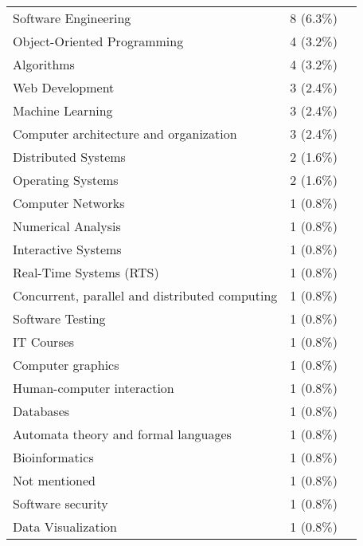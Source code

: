 \begin{table}[ht]
\begin{tabular}{l c p{4cm}}
		Software Engineering & 8 (6.3\%) & \cite{farah2023prompting,hanifi2023chatgpt,kirova2024software,kruger2024performance,petrovska2024incorporating,rasnayaka2024empirical,rodriguezecheverria2024analysis,tanay2024exploratory} \\
		Object-Oriented Programming & 4 (3.2\%) & \cite{cipriano2023gpt3,cipriano2024llms,kruger2024performance,pankiewicz2023large} \\
		Algorithms & 4 (3.2\%) & \cite{jin2024teach,kuramitsu2023kogi,mendoncca2024evaluating,sterbini2024automated} \\
		Web Development & 3 (2.4\%) & \cite{kruger2024performance,macneil2023experiences,rajala2023call} \\
		Machine Learning & 3 (2.4\%) & \cite{drori2023human,reiche2024bridging,wolfer2024qualitative} \\
		Computer architecture and organization & 3 (2.4\%) & \cite{gehringer2024dualsubmission,mendoncca2024evaluating,zhang2024assistant} \\
		Distributed Systems & 2 (1.6\%) & \cite{arora2024analyzing,kruger2024performance} \\
		Operating Systems & 2 (1.6\%) & \cite{agarwal2024which,kruger2024performance} \\
		Computer Networks & 1 (0.8\%) & \cite{kruger2024performance} \\
		Numerical Analysis & 1 (0.8\%) & \cite{kruger2024performance} \\
		Interactive Systems & 1 (0.8\%) & \cite{kruger2024performance} \\
		Real-Time Systems (RTS) & 1 (0.8\%) & \cite{kruger2024performance} \\
		Concurrent, parallel and distributed computing & 1 (0.8\%) & \cite{estevezayres2024evaluation} \\
		Software Testing & 1 (0.8\%) & \cite{jalil2023chatgpt} \\
		IT Courses & 1 (0.8\%) & \cite{gumina2023teaching} \\
		Computer graphics & 1 (0.8\%) & \cite{feng2024more} \\
		Human-computer interaction & 1 (0.8\%) & \cite{freire2024may} \\
		Databases & 1 (0.8\%) & \cite{prakash2024integrating} \\
		Automata theory and formal languages & 1 (0.8\%) & \cite{mendoncca2024evaluating} \\
		Bioinformatics & 1 (0.8\%) & \cite{piccolo2023evaluating} \\
		Not mentioned & 1 (0.8\%) & \cite{babe2023studenteval} \\
		Software security & 1 (0.8\%) & \cite{li2023evaluating} \\
		Data Visualization & 1 (0.8\%) & \cite{kim2024chatgpt} \\
	\bottomrule
    \end{tabular}
    \label{tab:discipline}
\end{table}